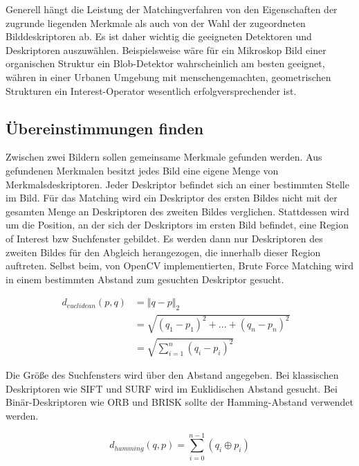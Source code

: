 Generell hängt die Leistung der Matchingverfahren von den Eigenschaften der zugrunde liegenden Merkmale als auch von der Wahl der zugeordneten Bilddeskriptoren ab. Es ist daher wichtig die geeigneten Detektoren und Deskriptoren auszuwählen. Beispielsweise wäre für ein Mikroskop Bild einer organischen Struktur ein Blob-Detektor wahrscheinlich am besten geeignet, währen in einer Urbanen Umgebung mit menschengemachten, geometrischen Strukturen ein Interest-Operator wesentlich erfolgversprechender ist.
\newline

\subsection{Übereinstimmungen finden}
Zwischen zwei Bildern sollen gemeinsame Merkmale gefunden werden. Aus gefundenen Merkmalen besitzt jedes Bild eine eigene Menge von Merkmalsdeskriptoren. Jeder Deskriptor befindet sich an einer bestimmten Stelle im Bild. Für das Matching wird ein Deskriptor des ersten Bildes nicht mit der gesamten Menge an Deskriptoren des zweiten Bildes verglichen. Stattdessen wird um die Position, an der sich der Deskriptors im ersten Bild befindet, eine Region of Interest bzw Suchfenster gebildet. Es werden dann nur Deskriptoren des zweiten Bildes für den Abgleich herangezogen, die innerhalb dieser Region auftreten. Selbst beim, von OpenCV implementierten, Brute Force Matching wird in einem bestimmten Abstand zum gesuchten Deskriptor gesucht. 

\begin{equation}
    \begin{aligned}
      d_{euclidean}(p,q) & = \Vert q-p {\Vert}_2&\\
      & = \sqrt{(q_1 - p_1)^2 + ... + (q_n - p_n)^2}&\\
      & = \sqrt{\sum_{i = 1}^{n} (q_i - p_i)^2  } 
      \label{eq:l2norm}
    \end{aligned}
\end{equation}

Die Grö{\ss}e des Suchfensters wird über den Abstand angegeben. Bei klassischen Deskriptoren wie SIFT und SURF wird im Euklidischen Abstand gesucht. Bei Binär-Deskriptoren wie ORB und BRISK sollte der Hamming-Abstand verwendet werden.   

\begin{equation}
  d_{hamming} \left ( q,p \right ) = \sum_{i=0}^{n-1} \left ( q_i \oplus p_i \right )
  \label{eq:hamming}
\end{equation}

